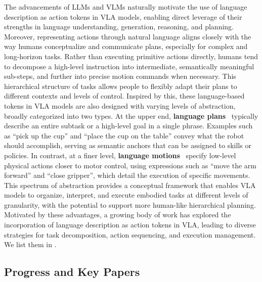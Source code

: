 \documentclass[10pt, a4paper, logo, copyright]{googledeepmind} %
\begin{document}
The advancements of LLMs and VLMs naturally motivate the use of language description as action tokens in VLA models, enabling direct leverage of their strengths in language understanding, generation, reasoning, and planning. Moreover, representing actions through natural language aligns closely with the way humans conceptualize and communicate plans, especially for complex and long-horizon tasks.
Rather than executing primitive actions directly, humans tend to decompose a high-level instruction into intermediate, semantically meaningful sub-steps, and further into precise motion commands when necessary.
This hierarchical structure of tasks allows people to flexibly adapt their plans to different contexts and levels of control.
Inspired by this, these language-based tokens in VLA models are also designed with varying levels of abstraction, broadly categorized into two types.
At the upper end, \textbf{language plans}~\cite{huang2022inner, driess2023palme, saycan2022arxiv, ji2025robobrain, shi2025hi, huang2022language, huang2023voxposer} typically describe an entire subtask or a high-level goal in a single phrase.
Examples such as ``pick up the cup'' and ``place the cup on the table'' convey what the robot should accomplish, serving as semantic anchors that can be assigned to skills or policies.
In contrast, at a finer level, \textbf{language motions}~\cite{rth2024arxiv, cheng2024navila} specify low-level physical actions closer to motor control, using expressions such as ``move the arm forward'' and ``close gripper'', which detail the execution of specific movements.
This spectrum of abstraction provides a conceptual framework that enables VLA models to organize, interpret, and execute embodied tasks at different levels of granularity, with the potential to support more human-like hierarchical planning.
Motivated by these advantages, a growing body of work has explored the incorporation of language description as action tokens in VLA, leading to diverse strategies for task decomposition, action sequencing, and execution management. We list them in .


\subsection{Progress and Key Papers}
\end{document}
